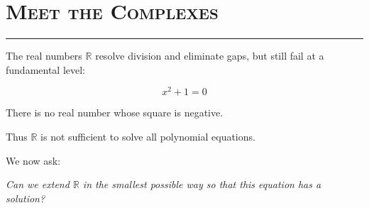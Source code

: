 \documentclass[11pt]{article}
\newcommand{\R}{\mathbb{R}}
\newcommand{\sepline}{
    \vspace{0.5em}
    \hrule
    \vspace{1em}
}
\begin{document}
\section*{\textsc{Meet the Complexes}}
\sepline

The real numbers $\R$ resolve division and eliminate gaps, but still fail at a fundamental level:

\[
x^2 + 1 = 0
\]

There is no real number whose square is negative.

Thus $\R$ is not sufficient to solve all polynomial equations.

We now ask:

\textit{Can we extend $\R$ in the smallest possible way so that this equation has a solution?}
\end{document}
